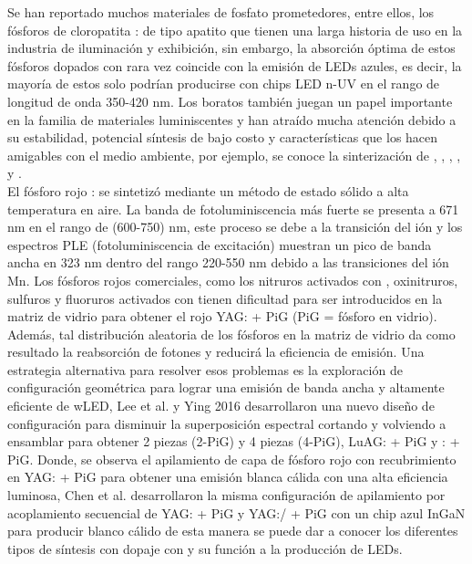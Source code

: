 Se han reportado muchos materiales de fosfato prometedores, entre ellos, los
fósforos de cloropatita : de tipo
apatito que tienen una larga historia de uso en la industria de iluminación y
exhibición, sin embargo, la absorción óptima de estos fósforos dopados con
 rara vez coincide con la emisión de LEDs azules, es decir, la mayoría de
estos solo podrían producirse con chips LED n-UV en el rango de longitud de
onda 350-420 nm. Los boratos también juegan un papel importante en la familia
de materiales luminiscentes y han atraído mucha atención debido a su
estabilidad, potencial síntesis de bajo costo y características que los hacen
amigables con el medio ambiente, por ejemplo, se conoce la sinterización de
, , , ,
 y \cite{Wu2018}.\\

El fósforo rojo : se sintetizó mediante un método de
estado sólido a alta temperatura en aire. La banda de fotoluminiscencia
más fuerte se presenta a 671 nm en el rango de (600-750) nm, este proceso se debe
a la transición  del ión  y los espectros PLE
(fotoluminiscencia de excitación) muestran un pico de banda ancha en 323 nm dentro
del rango 220-550 nm debido a las transiciones  del ión
Mn\cite{Cao2015}. Los fósforos rojos comerciales, como los nitruros activados
con , oxinitruros, sulfuros y fluoruros activados con 
tienen dificultad para ser introducidos en la matriz de vidrio para obtener el
rojo YAG: + PiG (PiG = fósforo en vidrio). Además, tal distribución aleatoria de los
fósforos en la matriz de vidrio da como resultado la reabsorción de fotones y
reducirá la eficiencia de emisión\cite{Chen2016}. Una estrategia alternativa
para resolver esos problemas es la exploración de configuración geométrica para
lograr una emisión de banda ancha y altamente eficiente de wLED, Lee et al. y Ying 2016
desarrollaron una nuevo diseño de configuración para disminuir la superposición
espectral cortando y volviendo a ensamblar para obtener 2 piezas (2-PiG) y 
4 piezas (4-PiG), LuAG: + PiG y : +
PiG. Donde, se observa el apilamiento de capa de fósforo rojo con recubrimiento
en YAG: + PiG para obtener una emisión blanca cálida 
con una alta eficiencia luminosa, Chen et al. desarrollaron la misma configuración de
apilamiento por acoplamiento secuencial de YAG: + PiG y
YAG:/ + PiG con un chip azul InGaN para producir blanco
cálido de esta manera se puede dar a conocer los diferentes tipos de síntesis
con dopaje con  y su función a la producción de
LEDs\cite{Lin2015,Xiang2016}.\\


